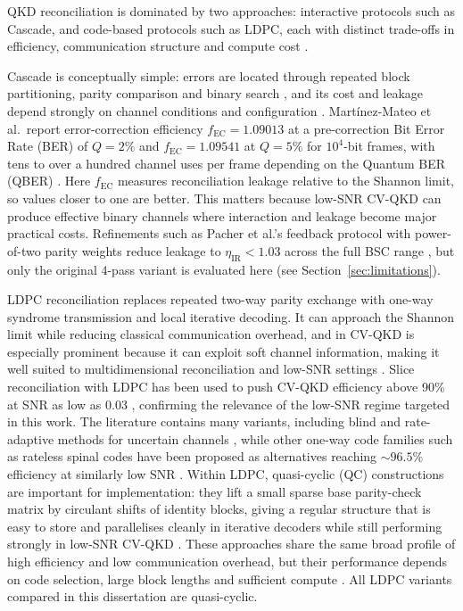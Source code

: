 \documentclass{UoYCSproject}
\begin{document}
QKD reconciliation is dominated by two approaches: interactive protocols such
as Cascade, and code-based protocols such as LDPC, each with distinct
trade-offs in efficiency, communication structure and compute cost
\cite{martinez-mateo_demystifying_2015}.

Cascade is conceptually simple: errors are located through repeated block
partitioning, parity comparison and binary search
\cite{martinez-mateo_demystifying_2015, reis2019quantum}, and its cost and
leakage depend strongly on channel conditions and configuration
\cite{reis2019quantum, tupkary_using_2023}. Mart\'inez-Mateo et al.\ report
error-correction efficiency $f_{\mathrm{EC}} = 1.09013$ at a pre-correction
Bit Error Rate (BER) of $Q = 2\%$ and $f_{\mathrm{EC}} = 1.09541$ at
$Q = 5\%$ for $10^{4}$-bit frames, with tens to over a hundred channel uses
per frame depending on the Quantum BER (QBER)
\cite{martinez-mateo_demystifying_2015}. Here $f_{\mathrm{EC}}$ measures
reconciliation leakage relative to the Shannon limit, so values closer to one
are better. This matters because low-SNR CV-QKD can produce effective binary
channels where interaction and leakage become major practical costs.
Refinements such as Pacher et al.'s feedback protocol with power-of-two parity
weights reduce leakage to $\eta_{\mathrm{IR}}\!<\!1.03$ across the full BSC
range \cite{pacher_information_2015}, but only the original 4-pass variant is
evaluated here (see Section~\ref{sec:limitations}).

LDPC reconciliation replaces repeated two-way parity exchange with one-way
syndrome transmission and local iterative decoding. It can approach the
Shannon limit while reducing classical communication overhead, and in CV-QKD
is especially prominent because it can exploit soft channel information,
making it well suited to multidimensional reconciliation and low-SNR settings
\cite{leverrier_multidimensional_2008, milicevic_quasi-cyclic_2018}. Slice
reconciliation with LDPC has been used to push CV-QKD efficiency above 90\%
at SNR as low as 0.03 \cite{jouguet_high-bit-rate_2014}, confirming the
relevance of the low-SNR regime targeted in this work. The literature contains
many variants, including blind and rate-adaptive methods for uncertain
channels \cite{gumus_novel_2021, mueller_performance_2025}, while other
one-way code families such as rateless spinal codes have been proposed as
alternatives reaching $\sim\!96.5\%$ efficiency at similarly low SNR
\cite{wen_novel_2019}. Within LDPC, quasi-cyclic (QC) constructions are
important for implementation: they lift a small sparse base parity-check
matrix by circulant shifts of identity blocks, giving a regular structure that
is easy to store and parallelises cleanly in iterative decoders while still
performing strongly in low-SNR CV-QKD \cite{milicevic_quasi-cyclic_2018}.
These approaches share the same broad profile of high efficiency and low
communication overhead, but their performance depends on code selection, large
block lengths and sufficient compute \cite{milicevic_quasi-cyclic_2018,
gumus_novel_2021}. All LDPC variants compared in this dissertation are
quasi-cyclic.
\end{document}
